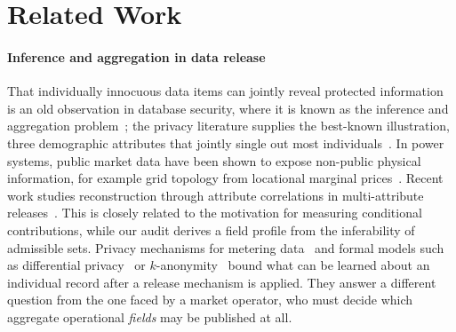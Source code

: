 \section{Related Work}\label{sec:related}

\paragraph{Inference and aggregation in data release}
That individually innocuous data items can jointly reveal protected information is an old
observation in database security, where it is known as the inference and aggregation
problem~\cite{lunt1989aggregation,farkas2002inference}; the privacy literature supplies the
best-known illustration, three demographic attributes that jointly single out most
individuals~\cite{sweeney2000simple}. In power systems, public market data have been shown to
expose non-public physical information, for example grid topology from locational marginal
prices~\cite{kekatos2014topology}. Recent work studies reconstruction through attribute correlations in multi-attribute releases~\cite{jiang2025correlation}. This is closely related to the motivation for measuring conditional contributions, while our audit derives a field profile from the inferability of admissible sets. Privacy mechanisms for metering data~\cite{mcdaniel2009smartgrid,giaconi2018smartmeter}
and formal models such as differential privacy~\cite{dwork2014dp} or
$k$-anonymity~\cite{sweeney2002kanonymity} bound what can be learned about an individual
record after a release mechanism is applied. They answer a different question from the one
faced by a market operator, who must decide which aggregate operational \emph{fields} may be
published at all.

